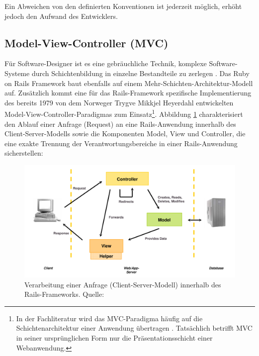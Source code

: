 Ein Abweichen von den definierten Konventionen ist jederzeit möglich, erhöht jedoch den Aufwand des Entwicklers.

\subsection{Model-View-Controller (MVC)}
\label{sec:mvc}
Für Software-Designer ist es  eine gebräuchliche Technik, komplexe Software-Systeme durch Schichtenbildung in einzelne Bestandteile zu zerlegen \citep[Kapitel 1]{FowlerPatterns}. Das Ruby on Rails Framework baut ebenfalls auf einem Mehr-Schichten-Architektur-Modell auf. Zusätzlich kommt eine für das Rails-Framework spezifische Implementierung des bereits 1979 von dem Norweger Trygve Mikkjel Heyerdahl entwickelten Model-View-Controller-Paradigmas zum Einsatz\footnote{In der Fachliteratur wird das MVC-Paradigma häufig auf die Schichtenarchitektur einer Anwendung übertragen \cite[S. 544 ff.]{objekt}. Tatsächlich betrifft MVC in seiner  ursprünglichen Form nur die Präsentationsschicht einer Webanwendung.}.
Abbildung \ref{fig:mvcimage} charakterisiert den Ablauf einer Anfrage (Request) an eine Rails-Anwendung innerhalb des Client-Server-Modells sowie die Komponenten Model, View und Controller, die eine exakte Trennung der Verantwortungsbereiche in einer Rails-Anwendung sicherstellen:

\begin{figure}[!h]
\begin{center}
\includegraphics[scale=0.4]{images/analyse/mvc.png}


\caption[Verarbeitung einer Anfrage innerhalb des Rails-Frameworks]{Verarbeitung einer Anfrage (Client-Server-Modell) innerhalb des Rails-Frameworks. Quelle: \citep[Seite 6]{railsmvc}}
\label{fig:mvcimage}
\end{center}
\end{figure}

